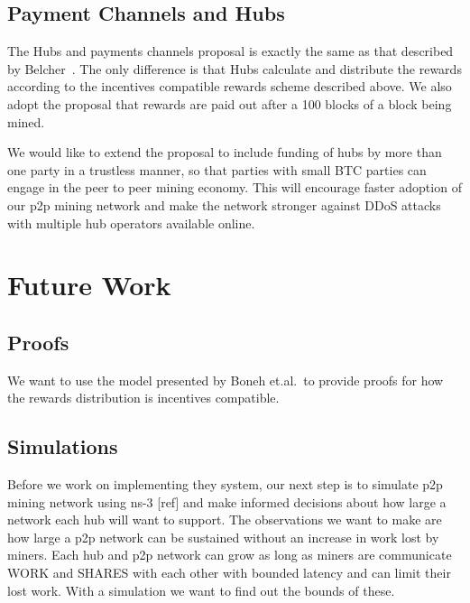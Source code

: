 \documentclass{article}
\begin{document}

\subsection{Payment Channels and Hubs}

The Hubs and payments channels proposal is exactly the same as that
described by Belcher~\cite{channels-for-rewards}. The only difference
is that Hubs calculate and distribute the rewards according to the
incentives compatible rewards scheme described above. We also adopt
the proposal that rewards are paid out after a 100 blocks of a block
being mined.

We would like to extend the proposal to include funding of hubs by
more than one party in a trustless manner, so that parties with small
BTC parties can engage in the peer to peer mining economy. This will
encourage faster adoption of our p2p mining network and make the
network stronger against DDoS attacks with multiple hub operators
available online.




   

\section{Future Work}

\subsection{Proofs}

We want to use the model presented by Boneh et.al.\ to provide proofs
for how the rewards distribution is incentives compatible.

\subsection{Simulations}
Before we work on implementing they system, our next step is to
simulate p2p mining network using ns-3 [ref] and make informed
decisions about how large a network each hub will want to support. The
observations we want to make are how large a p2p network can be
sustained without an increase in work lost by miners. Each hub and p2p
network can grow as long as miners are communicate WORK and SHARES
with each other with bounded latency and can limit their lost
work. With a simulation we want to find out the bounds of these.
\end{document}
